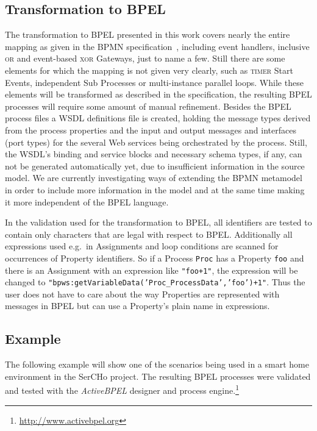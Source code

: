 \subsection{Transformation to BPEL}
\label{sec:trafo_bpel}

The transformation to BPEL presented in this work covers nearly the entire mapping as given in the BPMN specification~\cite[Chapter 11]{omg2006business}, including event handlers, inclusive \textsc{or} and event-based \textsc{xor} Gateways, just to name a few.  Still there are some elements for which the mapping is not given very clearly, such as \textsc{timer} Start Events, independent Sub Processes or multi-instance parallel loops.  While these elements will be transformed as described in the specification, the resulting BPEL processes will require some amount of manual refinement.  Besides the BPEL process files a WSDL definitions file is created, holding the message types derived from the process properties and the input and output messages and interfaces (port types) for the several Web services being orchestrated by the process.  Still, the WSDL's binding and service blocks and necessary schema types, if any, can not be generated automatically yet, due to insufficient information in the source model.  We are currently investigating ways of extending the BPMN metamodel in order to include more information in the model and at the same time making it more independent of the BPEL language.

In the validation used for the transformation to BPEL, all identifiers are tested to contain only characters that are legal with respect to BPEL.  Additionally all expressions used e.g.\ in Assignments and loop conditions are scanned for occurrences of Property identifiers.  So if a Process \texttt{Proc} has a Property \texttt{foo} and there is an Assignment with an expression like \texttt{"foo+1"}, the expression will be changed to \texttt{"bpws:getVariableData('Proc\_ProcessData','foo')+1"}.  Thus the user does not have to care about the way Properties are represented with messages in BPEL but can use a Property's plain name in expressions.


\subsection{Example}
\label{sec:trafo_example}

The following example will show one of the scenarios being used in a smart home environment in the SerCHo project.  The resulting BPEL processes were validated and tested with the \emph{ActiveBPEL} designer and process engine.\footnote{\url{http://www.activebpel.org}}


